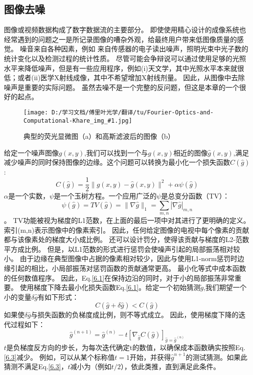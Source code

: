 \documentclass[12pt, UTF8]{ctexart}%
\numberwithin{equation}{section}
\numberwithin{figure}{section}
\newcommand {\InsertPic}[3]{\begin{figure}[htbp]\centering \texttt{[image: D:/学习文档/傅里叶光学/翻译/tu/Fourier-Optics-and-Computational-Khare\_img\_\#1.jpg]}\caption{#3}  \label{#2}\end{figure}}%
\newcommand{\InsertEqution}[2]{\begin{equation}
  \label{#1}
   #2
 \end{equation}}
\newcommand{\RefEq}[1]{Eq.\ref{#1}}
\newcommand{\InsertInlineEq}[1]{$#1$}
\begin{document}
\begin{sloppypar}
\subsection{图像去噪}
图像或视频数据构成了数字数据流的主要部分。 即使使用精心设计的成像系统也经常遇到的问题之一是所记录图像的嘈杂外观，给最终用户带来低图像质量的感觉。 噪音来自各种因素，例如 来自传感器的电子读出噪声，照明光束中光子数的统计变化以及检测过程的统计性质。 尽管可能会争辩说可以通过使用足够的光照水平来降低噪声，但是有一些应用程序，例如(i)天文学，其中光照水平本来就很低；或者(ii)医学X射线成像，其中不希望增加X射线剂量。 因此，从图像中去除噪声是重要的实际问题。 虽然去噪不是一个完整的反问题，但这是本章的一个很好的起点。
\InsertPic{23}{F6.1}{典型的荧光显微图（a）和高斯滤波后的图像（b）}
给定一个噪声图像\InsertInlineEq{g(x,y)},我们可以找到一个与\InsertInlineEq{g(x,y)}相近的图像\InsertInlineEq{\hat{g}(x,y)},满足减少噪声的同时保持图像的边缘。这个问题可以转换为最小化一个损失函数\InsertInlineEq{C(\hat{g})}:
\InsertEqution{6.1}{C(\hat{g})=\frac{1}{2}\|g(x, y)-\hat{g}(x, y)\|^{2}+\alpha \psi(\hat{g})}
\InsertInlineEq{\alpha}是一个实数，\InsertInlineEq{\psi}是一个玉树方程。一个应用广泛的\InsertInlineEq{\psi}是总变分函数（TV）：
\InsertEqution{6.2}{\psi(\hat{g})=T V(\hat{g})=\|\nabla \hat{g}\|_{1}=\sum_{m, n}|\nabla \hat{g}|_{m, n}}。
TV功能被视为梯度的L1范数，在上面的最后一项中对其进行了更明确的定义。 索引(m,n)表示图像中的像素索引。 因此，任何给定图像的电视中每个像素的贡献都与该像素处的梯度大小成比例。 还可以设计罚分，使得该贡献与梯度的L2-范数平方成比例。 但是，以L1范数的形式进行惩罚会使噪声引起的局部振荡相对较小。 由于边缘在典型图像中占据的像素相对较少，因此与使用L1-norm惩罚时边缘引起的相比，小局部振荡对惩罚函数的贡献通常更高。 最小化等式中成本函数的任何数值程序。 因此，\RefEq{6.1}在保持边沿的同时，对于小的局部振荡非常重要。
使用梯度下降去最小化损失函数\RefEq{6.1}。给定一个初始猜测\InsertInlineEq{\tilde{g}},我们期望一个小的变量\InsertInlineEq{\delta\hat{g}}有如下形式：
\InsertEqution{6.3}{C(\hat{g}+\delta\hat{g})<C(\hat{g})}
如果使\InsertInlineEq{\delta \hat{g}}与损失函数的负梯度成比例，则不等式成立。 因此，使用梯度下降的迭代过程如下：
\InsertEqution{6.4}{\hat{g}^{(n+1)}=\hat{g}^{(n)}-t\left[\nabla_{\hat{g}} C(\hat{g})\right]_{\hat{g}=\hat{g}^{(n)}}}
\InsertInlineEq{t}是负梯度反方向的步长，为每次迭代确定t的数值，以确保成本函数确实按照\RefEq{6.3}减少。 例如，可以从某个标称值\InsertInlineEq{t=1}开始，并获得\InsertInlineEq{\hat{g}^{n+1}}的测试猜测。如果此猜测不满足\RefEq{6.3}，\InsertInlineEq{t}减小为（例如\InsertInlineEq{t/2}），依此类推，直到满足此条件。


\end{sloppypar}
\end{document}
